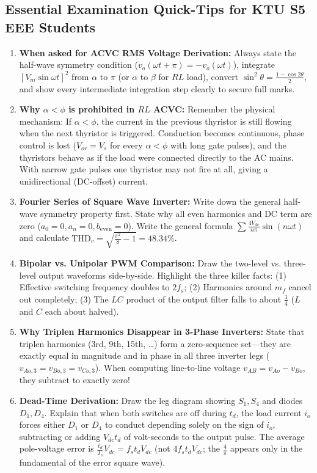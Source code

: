 \documentclass[11pt,a4paper]{article}
\let\origsubsection\subsection
\renewcommand{\subsection}{\Needspace{7\baselineskip}\origsubsection}
\begin{document}
\subsection{Essential Examination Quick-Tips for KTU S5 EEE Students}
\begin{enumerate}[leftmargin=*]
  \item \textbf{When asked for ACVC RMS Voltage Derivation:} Always state the half-wave symmetry condition ($v_o(\omega t + \pi) = -v_o(\omega t)$), integrate $[V_m \sin\omega t]^2$ from $\alpha$ to $\pi$ (or $\alpha$ to $\beta$ for $RL$ load), convert $\sin^2\theta = \frac{1 - \cos 2\theta}{2}$, and show every intermediate integration step clearly to secure full marks.
  \item \textbf{Why $\alpha < \phi$ is prohibited in $RL$ ACVC:} Remember the physical mechanism: If $\alpha < \phi$, the current in the previous thyristor is still flowing when the next thyristor is triggered. Conduction becomes continuous, phase control is lost ($V_{or} = V_s$ for every $\alpha < \phi$ with long gate pulses), and the thyristors behave as if the load were connected directly to the AC mains. With narrow gate pulses one thyristor may not fire at all, giving a unidirectional (DC-offset) current.
  \item \textbf{Fourier Series of Square Wave Inverter:} Write down the general half-wave symmetry property first. State why all even harmonics and DC term are zero ($a_0 = 0, a_n = 0, b_{\text{even}} = 0$). Write the general formula $\sum \frac{4V_{dc}}{n\pi}\sin(n\omega t)$ and calculate $\text{THD}_v = \sqrt{\frac{\pi^2}{8}-1} = 48.34\%$.
  \item \textbf{Bipolar vs. Unipolar PWM Comparison:} Draw the two-level vs. three-level output waveforms side-by-side. Highlight the three killer facts: (1) Effective switching frequency doubles to $2f_s$; (2) Harmonics around $m_f$ cancel out completely; (3) The $LC$ product of the output filter falls to about $\frac{1}{4}$ ($L$ and $C$ each about halved).
  \item \textbf{Why Triplen Harmonics Disappear in 3-Phase Inverters:} State that triplen harmonics (3rd, 9th, 15th, \dots) form a zero-sequence set—they are exactly equal in magnitude and in phase in all three inverter legs ($v_{Ao,3} = v_{Bo,3} = v_{Co,3}$). When computing line-to-line voltage $v_{AB} = v_{Ao} - v_{Bo}$, they subtract to exactly zero!
  \item \textbf{Dead-Time Derivation:} Draw the leg diagram showing $S_1, S_4$ and diodes $D_1, D_4$. Explain that when both switches are off during $t_d$, the load current $i_o$ forces either $D_1$ or $D_4$ to conduct depending solely on the sign of $i_o$, subtracting or adding $V_{dc}t_d$ of volt-seconds to the output pulse. The average pole-voltage error is $\frac{t_d}{T_s}V_{dc} = f_s t_d V_{dc}$ (not $4 f_s t_d V_{dc}$; the $\frac{4}{\pi}$ appears only in the fundamental of the error square wave).

\end{enumerate}
\end{document}
